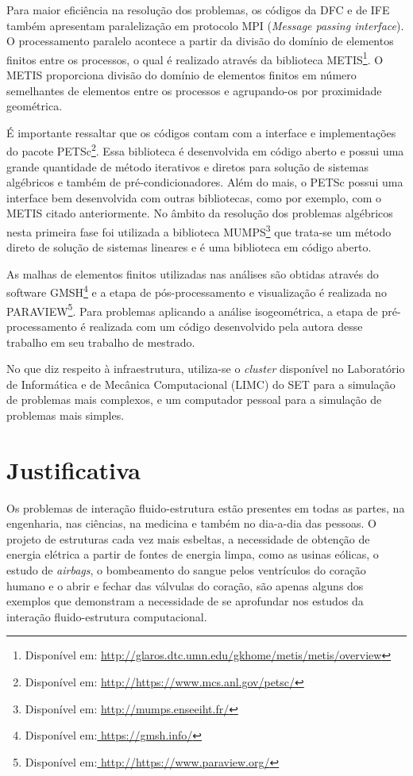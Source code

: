 \documentclass[tese_patricia.tex]{subfiles}
\begin{document}
Para maior eficiência na resolução dos problemas, os códigos da DFC e de IFE também apresentam paralelização em protocolo MPI (\textit{Message passing interface}). O processamento paralelo acontece a partir da divisão do domínio de elementos finitos entre os processos, o qual é realizado através da biblioteca METIS\footnote{Disponível em: \url{http://glaros.dtc.umn.edu/gkhome/metis/metis/overview}}. O METIS proporciona divisão do domínio de elementos finitos em número semelhantes de elementos entre os processos e agrupando-os por proximidade geométrica.

É importante ressaltar que os códigos contam com a interface e implementações do pacote PETSc\footnote{Disponível em: \url{http://https://www.mcs.anl.gov/petsc/}}. Essa biblioteca é desenvolvida em código aberto e possui uma grande quantidade de método iterativos e diretos para solução de sistemas algébricos e também de pré-condicionadores. Além do mais, o PETSc possui uma interface bem desenvolvida com outras bibliotecas, como por exemplo, com o METIS citado anteriormente. No âmbito da resolução dos problemas algébricos nesta primeira fase foi utilizada a biblioteca MUMPS\footnote{Disponível em: \url{ http://mumps.enseeiht.fr/}} que trata-se um método direto de solução de sistemas lineares e é uma biblioteca em código aberto.

As malhas de elementos finitos utilizadas nas análises são obtidas através do software GMSH\footnote{Disponível em:\url{ https://gmsh.info/}} e a etapa de pós-processamento e visualização é realizada no PARAVIEW\footnote{Disponível em:\url{ http://https://www.paraview.org/}}. Para problemas aplicando a análise isogeométrica, a etapa de pré-processamento é realizada com um código desenvolvido pela autora desse trabalho em seu trabalho de mestrado.

No que diz respeito à infraestrutura, utiliza-se o \textit{cluster} disponível no Laboratório de Informática e de Mecânica Computacional (LIMC) do SET para a simulação de problemas mais complexos, e um computador pessoal para a simulação de problemas mais simples.

\vspace{-0.8cm}

 \section[Justificativa]{Justificativa}

Os problemas de interação fluido-estrutura estão presentes em todas as partes, na engenharia, nas ciências, na medicina e também no dia-a-dia das pessoas.
O projeto de estruturas cada vez mais esbeltas, a necessidade de obtenção de energia elétrica a partir de fontes de energia limpa, como as usinas eólicas, o estudo de \textit{airbags}, o bombeamento do sangue pelos ventrículos do coração humano e o abrir e fechar das válvulas do coração, são apenas alguns dos exemplos que demonstram a necessidade de se aprofundar nos estudos da interação fluido-estrutura computacional.
\end{document}

